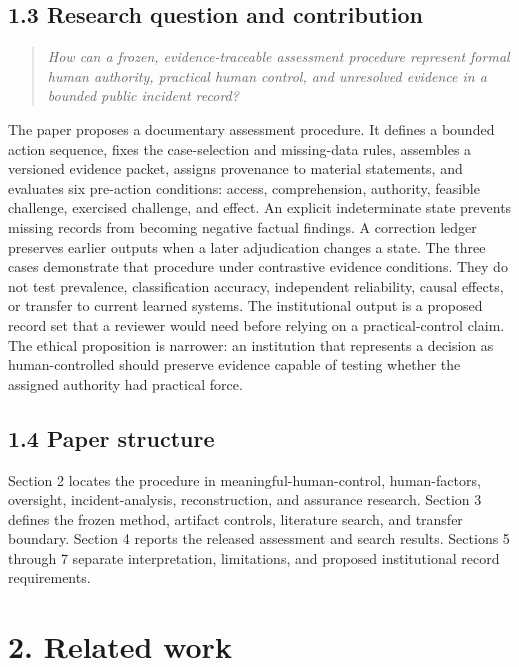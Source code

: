 \documentclass[11pt]{article}
\begin{document}
\subsection*{1.3 Research question and contribution}
\begin{quote}\itshape
How can a frozen, evidence-traceable assessment procedure represent formal human authority, practical human control, and unresolved evidence in a bounded public incident record?
\end{quote}
The paper proposes a documentary assessment procedure. It defines a bounded action sequence, fixes the case-selection and missing-data rules, assembles a versioned evidence packet, assigns provenance to material statements, and evaluates six pre-action conditions: access, comprehension, authority, feasible challenge, exercised challenge, and effect. An explicit indeterminate state prevents missing records from becoming negative factual findings. A correction ledger preserves earlier outputs when a later adjudication changes a state.
The three cases demonstrate that procedure under contrastive evidence conditions. They do not test prevalence, classification accuracy, independent reliability, causal effects, or transfer to current learned systems. The institutional output is a proposed record set that a reviewer would need before relying on a practical-control claim. The ethical proposition is narrower: an institution that represents a decision as human-controlled should preserve evidence capable of testing whether the assigned authority had practical force.
\subsection*{1.4 Paper structure}
Section 2 locates the procedure in meaningful-human-control, human-factors, oversight, incident-analysis, reconstruction, and assurance research. Section 3 defines the frozen method, artifact controls, literature search, and transfer boundary. Section 4 reports the released assessment and search results. Sections 5 through 7 separate interpretation, limitations, and proposed institutional record requirements.
\FloatBarrier
\section*{2. Related work}
\end{document}
